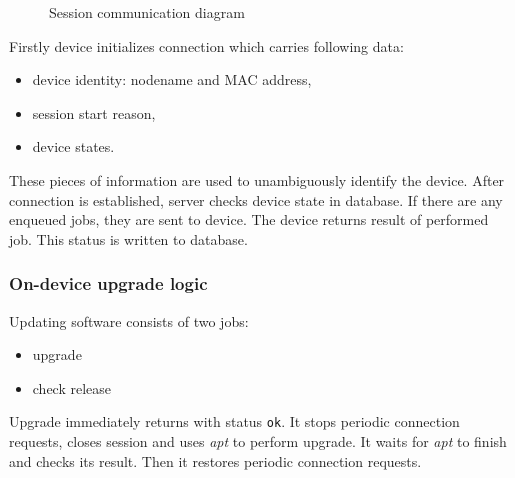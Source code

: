 \begin{figure}[htbp]
  \centering
    \caption{Session communication diagram}
\end{figure}

Firstly device initializes connection which carries following data:
\begin{itemize}
  \item device identity: nodename and MAC address,
  \item session start reason,
  \item device states.
\end{itemize}
These pieces of information are used to unambiguously identify the device.
After connection is established, server checks device state in database.
If there are any enqueued jobs, they are sent to device.
The device returns result of performed job. This status is written to database.

\subsubsection{On-device upgrade logic}

Updating software consists of two jobs:
\begin{itemize}
  \item upgrade
  \item check release
\end{itemize}

Upgrade immediately returns with status \verb|ok|. It stops periodic connection requests, closes session and uses \emph{apt} to perform upgrade. It waits for \emph{apt} to finish and checks its result. Then it restores periodic connection requests.

